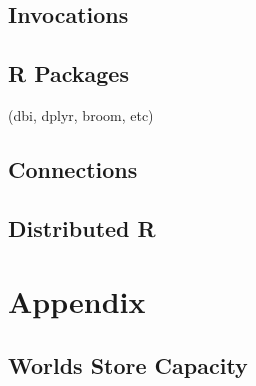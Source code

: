 \documentclass[]{book}
\theoremstyle{definition}
\theoremstyle{definition}
\theoremstyle{definition}
\theoremstyle{remark}
\begin{document}
\hypertarget{invocations}{%
\section{Invocations}\label{invocations}}

\hypertarget{r-packages}{%
\section{R Packages}\label{r-packages}}

(dbi, dplyr, broom, etc)

\hypertarget{connections-1}{%
\section{Connections}\label{connections-1}}

\hypertarget{distributed-r}{%
\section{Distributed R}\label{distributed-r}}

\hypertarget{appendix}{%
\chapter*{Appendix}\label{appendix}}

\hypertarget{storage-capacity}{%
\section{Worlds Store Capacity}\label{storage-capacity}}
\end{document}
